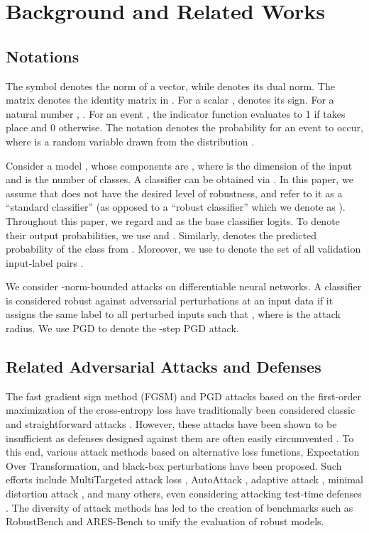 \documentclass[11pt, letterpaper]{article}
\theoremstyle{plain}
\theoremstyle{definition}
\begin{document}
\section{Background and Related Works}


\subsection{Notations}

The symbol  denotes the  norm of a vector, while  denotes its dual norm. The matrix  denotes the identity matrix in . For a scalar ,  denotes its sign. For a natural number , . For an event , the indicator function  evaluates to 1 if  takes place and 0 otherwise. The notation  denotes the probability for an event  to occur, where  is a random variable drawn from the distribution .

Consider a model , whose components are , where  is the dimension of the input and  is the number of classes. A classifier  can be obtained via . In this paper, we assume that  does not have the desired level of robustness, and refer to it as a ``standard classifier'' (as opposed to a ``robust classifier'' which we denote as ). Throughout this paper, we regard  and  as the base classifier logits. To denote their output probabilities, we use  and . Similarly,  denotes the predicted probability of the  class from . Moreover, we use  to denote the set of all validation input-label pairs .

We consider -norm-bounded attacks on differentiable neural networks. A classifier  is considered robust against adversarial perturbations at an input data  if it assigns the same label to all perturbed inputs  such that , where  is the attack radius. We use PGD to denote the -step PGD attack.


\subsection{Related Adversarial Attacks and Defenses}

The fast gradient sign method (FGSM) and PGD attacks based on the first-order maximization of the cross-entropy loss have traditionally been considered classic and straightforward attacks \citep{Madry18, Goodfellow15}. However, these attacks have been shown to be insufficient as defenses designed against them are often easily circumvented \citep{Carlini17a, Athalye18a, Athalye18b, Papernot17}. To this end, various attack methods based on alternative loss functions, Expectation Over Transformation, and black-box perturbations have been proposed. Such efforts include MultiTargeted attack loss \citep{Gowal19}, AutoAttack \citep{Croce20a}, adaptive attack \citep{Tramer20}, minimal distortion attack \citep{Croce20b}, and many others, even considering attacking test-time defenses \citep{Croce22}. The diversity of attack methods has led to the creation of benchmarks such as RobustBench \citep{Croce20c} and ARES-Bench \citep{Liu23} to unify the evaluation of robust models.
\end{document}

